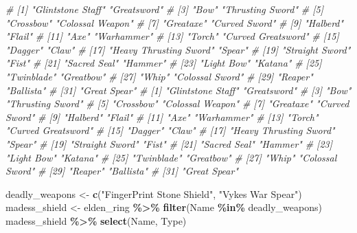 \documentclass[
]{article}
\newenvironment{Shaded}{\begin{snugshade}}{\end{snugshade}}
\newcommand{\CommentTok}[1]{\textcolor[rgb]{0.56,0.35,0.01}{\textit{#1}}}
\newcommand{\FunctionTok}[1]{\textcolor[rgb]{0.13,0.29,0.53}{\textbf{#1}}}
\newcommand{\NormalTok}[1]{#1}
\newcommand{\OtherTok}[1]{\textcolor[rgb]{0.56,0.35,0.01}{#1}}
\newcommand{\SpecialCharTok}[1]{\textcolor[rgb]{0.81,0.36,0.00}{\textbf{#1}}}
\newcommand{\StringTok}[1]{\textcolor[rgb]{0.31,0.60,0.02}{#1}}
\begin{document}
\begin{Shaded}
\begin{Highlighting}[]
\CommentTok{\#  [1] "Glintstone Staff"      "Greatsword"}
\CommentTok{\#  [3] "Bow"                   "Thrusting Sword"}
\CommentTok{\#  [5] "Crossbow"              "Colossal Weapon"}
\CommentTok{\#  [7] "Greataxe"              "Curved Sword"}
\CommentTok{\#  [9] "Halberd"               "Flail"}
\CommentTok{\# [11] "Axe"                   "Warhammer"}
\CommentTok{\# [13] "Torch"                 "Curved Greatsword"}
\CommentTok{\# [15] "Dagger"                "Claw"}
\CommentTok{\# [17] "Heavy Thrusting Sword" "Spear"}
\CommentTok{\# [19] "Straight Sword"        "Fist"}
\CommentTok{\# [21] "Sacred Seal"           "Hammer"}
\CommentTok{\# [23] "Light Bow"             "Katana"}
\CommentTok{\# [25] "Twinblade"             "Greatbow"}
\CommentTok{\# [27] "Whip"                  "Colossal Sword"}
\CommentTok{\# [29] "Reaper"                "Ballista"}
\CommentTok{\# [31] "Great Spear"}
\CommentTok{\#  [1] "Glintstone Staff"      "Greatsword"}
\CommentTok{\#  [3] "Bow"                   "Thrusting Sword"}
\CommentTok{\#  [5] "Crossbow"              "Colossal Weapon"}
\CommentTok{\#  [7] "Greataxe"              "Curved Sword"}
\CommentTok{\#  [9] "Halberd"               "Flail"}
\CommentTok{\# [11] "Axe"                   "Warhammer"}
\CommentTok{\# [13] "Torch"                 "Curved Greatsword"}
\CommentTok{\# [15] "Dagger"                "Claw"}
\CommentTok{\# [17] "Heavy Thrusting Sword" "Spear"}
\CommentTok{\# [19] "Straight Sword"        "Fist"}
\CommentTok{\# [21] "Sacred Seal"           "Hammer"}
\CommentTok{\# [23] "Light Bow"             "Katana"}
\CommentTok{\# [25] "Twinblade"             "Greatbow"}
\CommentTok{\# [27] "Whip"                  "Colossal Sword"}
\CommentTok{\# [29] "Reaper"                "Ballista"}
\CommentTok{\# [31] "Great Spear"}


\NormalTok{deadly\_weapons }\OtherTok{\textless{}{-}} \FunctionTok{c}\NormalTok{(}\StringTok{"FingerPrint Stone Shield"}\NormalTok{, }\StringTok{"Vyke\textquotesingle{}s War Spear"}\NormalTok{)}
\NormalTok{madess\_shield }\OtherTok{\textless{}{-}}\NormalTok{ elden\_ring }\SpecialCharTok{\%\textgreater{}\%}
  \FunctionTok{filter}\NormalTok{(Name }\SpecialCharTok{\%in\%}\NormalTok{ deadly\_weapons)}
\NormalTok{madess\_shield }\SpecialCharTok{\%\textgreater{}\%}
  \FunctionTok{select}\NormalTok{(Name, Type)}
\end{Highlighting}
\end{Shaded}
\end{document}
